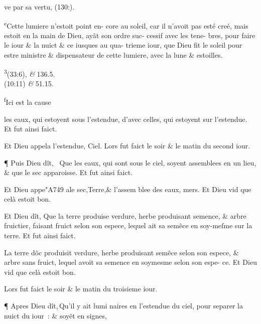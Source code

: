 \documentclass[twocolumn,paper=a4,pagesize=pdftex,12pt,headinclude=on]{scrbook}
\newcommand{\fakenote}[3][\space]{%
   \par\noindent#1\textsuperscript#2\justifying#3
}
\newcounter{verse}
\newcommand{\bverse}{%
  \linebreak
  \addtocounter{verse}{1}
  \theverse\quad
}
\begin{document}
{{ ve par sa vertu, \linebreak
 (130:).}
   \fakenote{e}{Cette lumiere \linebreak
 n'estoit point en- \linebreak
 core au soleil, car \linebreak
 il n'avoit pas esté \linebreak
 creé, mais estoit en \linebreak
 la main de Dieu, \linebreak
 ay\~at son ordre suc- \linebreak
 cessif avec les tene- \linebreak
 bres, pour faire le \linebreak
 iour \& la nuict \& \linebreak
 ce iusques au qua- \linebreak
 trieme iour, que \linebreak
 Dieu fit le soleil \linebreak
 pour estre ministre \linebreak
 \& dispensateur de \linebreak
 cette lumiere, avec \linebreak
 la lune \& estoilles.}
   \fakenote{3}{(33:6), \textit\& 136.5.\\
                \bibleverse{Je}(10:11) \textit\& 51.15.}
   \fakenote{f}{Ici est la cause}
}
 \pagebreak
\vspace{\baselineskip}

 \noindent les eaux, qui estoyent sous
 l'estendue, d'avec celles, qui estoyent sur l'esten\-due. Et fut ainsi faict.
\bverse Et Dieu appela l'estendue, Ciel.
 Lors fut faict le soir \& le matin du second iour.
\bverse ¶ Puis Dieu dît, 
 \footnotemarkverse{}~\footnotemarkmain{}Que les eaux,
 qui sont sous le ciel,
 soyent assemblees en un lieu, \& que le sec apparoisse. Et fut ainsi faict.
\bverse Et Dieu appe\char"A749 ale sec,Terre,\& l'assem \linebreak
 blee des eaux, mers.
 Et Dieu vid que celà estoit bon.
\bverse Et Dieu dît, Que la terre produise verdure, herbe produisant semence,
 \& arbre fruictier, faisant fruict selon son espece, lequel ait sa sem\~ece
 en soy-meſ\-me sur la terre. Et fut ainsi faict.
\bverse La terre d\~oc produisit verdure, her\-be produisant sem\~ece
 selon son espece, \& arbre sans fruict, lequel avoit sa \linebreak
  semence en soymesme selon son espe- \linebreak
 ce. Et Dieu vid que celà estoit bon.
\bverse Lors fut faict le soir \& le matin du troisieme iour.
\addtocounter{footnotemain}{1}
\bverse ¶ Apres Dieu dît,\footnotemarkverse{}\,\footnotemarkmain{}Qu'il y ait lumi \linebreak
 naires en l'estendue du ciel, pour
 sepa\-rer la nuict du iour~: \& soy\~et en
 \footnotemarkmain{}signes,
\end{document}
